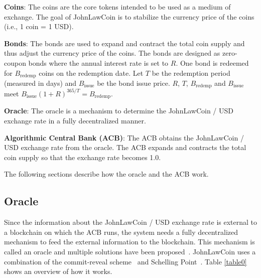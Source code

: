 \documentclass[dvipdfmx,a4paper]{article}
\begin{document}
\begin{description}
\item{\textbf{Coins}}: The coins are the core tokens intended to be used as a medium of exchange. The goal of JohnLawCoin is to stabilize the currency price of the coins (i.e., 1 coin = 1 USD).
\item{\textbf{Bonds}}: The bonds are used to expand and contract the total coin supply and thus adjust the currency price of the coins. The bonds are designed as zero-coupon bonds where the annual interest rate is set to $R$. One bond is redeemed for $B_{\mathrm{redemp}}$ coins on the redemption date. Let $T$ be the redemption period (measured in days) and $B_{\mathrm{issue}}$ be the bond issue price. $R$, $T$, $B_{\mathrm{redemp}}$ and $B_{\mathrm{issue}}$ meet $B_{\mathrm{issue}}(1+R)^{365/T}=B_{\mathrm{redemp}}$.
\item{\textbf{Oracle}}: The oracle is a mechanism to determine the JohnLawCoin / USD exchange rate in a fully decentralized manner.
\item{\textbf{Algorithmic Central Bank (ACB)}}: The ACB obtains the JohnLawCoin / USD exchange rate from the oracle. The ACB expands and contracts the total coin supply so that the exchange rate becomes 1.0.
\end{description}

The following sections describe how the oracle and the ACB work.

\subsection{Oracle}

Since the information about the JohnLawCoin / USD exchange rate is external to a blockchain on which the ACB runs, the system needs a fully decentralized mechanism to feed the external information to the blockchain. This mechanism is called an oracle and multiple solutions have been proposed~\cite{chainlink,adler2018astraea}. JohnLawCoin uses a combination of the commit-reveal scheme~\cite{wohrer2018design} and Schelling Point~\cite{shellingpoint}. Table \ref{table0} shows an overview of how it works.
\end{document}
